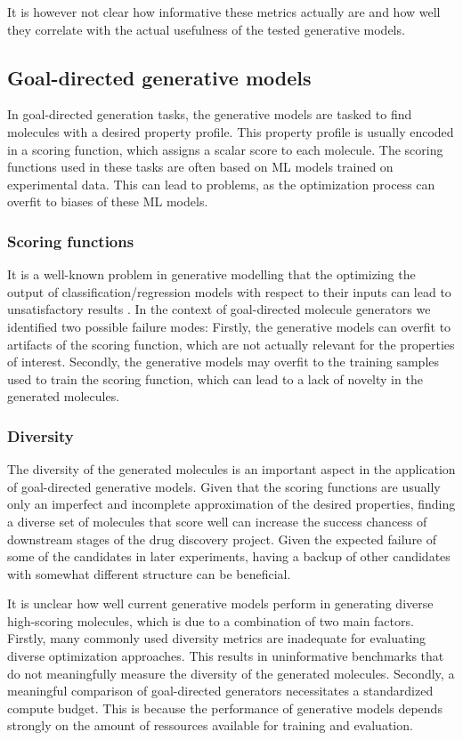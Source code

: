 It is however not clear how informative these metrics actually are and how well
they correlate with the actual usefulness of the tested generative models.

\subsection{Goal-directed generative models\label{sec:eval-gen}}

In goal-directed generation tasks, the generative models are tasked to find
molecules with a desired property profile. This property profile is usually 
encoded in a scoring function, which assigns a scalar score to each molecule. 
The scoring functions used in these tasks are often based on ML models trained on experimental
data. This can lead to problems, as the optimization process can overfit to
biases of these ML models. 

\subsubsection{Scoring functions}
It is a well-known problem in generative modelling that the optimizing the
output of classification/regression models with respect to their inputs can lead
to unsatisfactory results \citep{todo}. In the context of goal-directed molecule
generators we identified two possible failure modes: Firstly, the generative
models can overfit to artifacts of the scoring function, which are not actually
relevant for the properties of interest. Secondly, the generative models may
overfit to the training samples used to train the scoring function, which can
lead to a lack of novelty in the generated molecules.

\subsubsection{Diversity}
The diversity of the generated molecules is an important aspect in the
application of goal-directed generative models. Given that the scoring functions
are usually only an imperfect and incomplete approximation of the desired
properties, finding a diverse set of molecules that score well can increase the
success chancess of downstream stages of the drug discovery project. Given the
expected failure of some of the candidates in later experiments, having a backup
of other candidates with somewhat different structure can be beneficial.

It is unclear how well current generative models perform in generating diverse
high-scoring molecules, which is due to a combination of two main factors. 
Firstly, many commonly used diversity metrics are inadequate for evaluating
diverse optimization approaches. This results in uninformative benchmarks that
do not meaningfully measure the diversity of the generated molecules. Secondly,
a meaningful comparison of goal-directed generators necessitates a standardized
compute budget. This is because the performance of generative models depends strongly 
on the amount of ressources available for training and evaluation.

